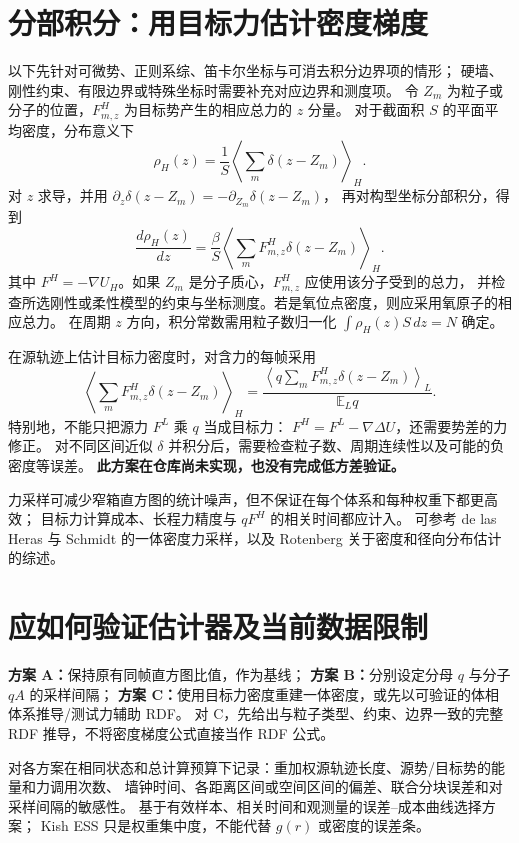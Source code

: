 \documentclass[11pt,a4paper]{article}
\newcommand{\E}{\mathbb E}\newcommand{\Var}{\operatorname{Var}}
\begin{document}
\section{分部积分：用目标力估计密度梯度}
以下先针对可微势、正则系综、笛卡尔坐标与可消去积分边界项的情形；
硬墙、刚性约束、有限边界或特殊坐标时需要补充对应边界和测度项。
令 $Z_m$ 为粒子或分子的位置，$F^H_{m,z}$ 为目标势产生的相应总力的 $z$ 分量。
对于截面积 $S$ 的平面平均密度，分布意义下
\begin{equation}
\rho_H(z)=\frac1S\left\langle\sum_m\delta(z-Z_m)\right\rangle_H.
\end{equation}
对 $z$ 求导，并用 $\partial_z\delta(z-Z_m)=-\partial_{Z_m}\delta(z-Z_m)$，
再对构型坐标分部积分，得到
\begin{equation}\boxed{
\frac{d\rho_H(z)}{dz}=
\frac{\beta}{S}\left\langle\sum_m F^H_{m,z}\delta(z-Z_m)\right\rangle_H.}
\end{equation}
其中 $F^H=-\nabla U_H$。如果 $Z_m$ 是分子质心，$F^H_{m,z}$ 应使用该分子受到的总力，
并检查所选刚性或柔性模型的约束与坐标测度。若是氧位点密度，则应采用氧原子的相应总力。
在周期 $z$ 方向，积分常数需用粒子数归一化 $\int\rho_H(z)S\,dz=N$ 确定。

在源轨迹上估计目标力密度时，对含力的每帧采用
\begin{equation}
\left\langle\sum_mF^H_{m,z}\delta(z-Z_m)\right\rangle_H
=\frac{\left\langle q\sum_mF^H_{m,z}\delta(z-Z_m)\right\rangle_L}
{\E_Lq}.
\end{equation}
特别地，不能只把源力 $F^L$ 乘 $q$ 当成目标力：
$F^H=F^L-\nabla\Delta U$，还需要势差的力修正。
对不同区间近似 $\delta$ 并积分后，需要检查粒子数、周期连续性以及可能的负密度等误差。
\textbf{此方案在仓库尚未实现，也没有完成低方差验证。}

力采样可减少窄箱直方图的统计噪声，但不保证在每个体系和每种权重下都更高效；
目标力计算成本、长程力精度与 $qF^H$ 的相关时间都应计入。
可参考 de las Heras 与 Schmidt 的一体密度力采样，以及 Rotenberg 关于密度和径向分布估计的综述。

\newpage
\section{应如何验证估计器及当前数据限制}
\textbf{方案 A：}保持原有同帧直方图比值，作为基线；
\textbf{方案 B：}分别设定分母 $q$ 与分子 $qA$ 的采样间隔；
\textbf{方案 C：}使用目标力密度重建一体密度，或先以可验证的体相体系推导/测试力辅助 RDF。
对 C，先给出与粒子类型、约束、边界一致的完整 RDF 推导，不将密度梯度公式直接当作 RDF 公式。

对各方案在相同状态和总计算预算下记录：重加权源轨迹长度、源势/目标势的能量和力调用次数、
墙钟时间、各距离区间或空间区间的偏差、联合分块误差和对采样间隔的敏感性。
基于有效样本、相关时间和观测量的误差--成本曲线选择方案；
Kish ESS 只是权重集中度，不能代替 $g(r)$ 或密度的误差条。
\end{document}
